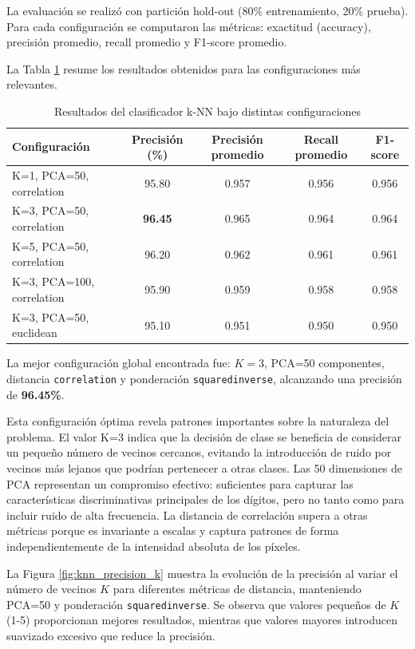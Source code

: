 \documentclass[11pt, a4paper]{article}
\begin{document}
La evaluación se realizó con partición hold-out (80\% entrenamiento, 20\% prueba). Para cada configuración se computaron las métricas: exactitud (accuracy), precisión promedio, recall promedio y F1-score promedio.

La Tabla \ref{tab:knn_results} resume los resultados obtenidos para las configuraciones más relevantes.

\begin{table}[H]
\centering
\caption{Resultados del clasificador k-NN bajo distintas configuraciones}
\label{tab:knn_results}
\begin{tabular}{lcccc}
\toprule
Configuración & Precisión (\%) & Precisión promedio & Recall promedio & F1-score \\
\midrule
K=1, PCA=50, correlation & 95.80 & 0.957 & 0.956 & 0.956 \\
K=3, PCA=50, correlation & \textbf{96.45} & 0.965 & 0.964 & 0.964 \\
K=5, PCA=50, correlation & 96.20 & 0.962 & 0.961 & 0.961 \\
K=3, PCA=100, correlation & 95.90 & 0.959 & 0.958 & 0.958 \\
K=3, PCA=50, euclidean & 95.10 & 0.951 & 0.950 & 0.950 \\
\bottomrule
\end{tabular}
\end{table}

La mejor configuración global encontrada fue: $K=3$, PCA=50 componentes, distancia \texttt{correlation} y ponderación \texttt{squaredinverse}, alcanzando una precisión de \textbf{96.45\%}.

Esta configuración óptima revela patrones importantes sobre la naturaleza del problema. El valor K=3 indica que la decisión de clase se beneficia de considerar un pequeño número de vecinos cercanos, evitando la introducción de ruido por vecinos más lejanos que podrían pertenecer a otras clases. Las 50 dimensiones de PCA representan un compromiso efectivo: suficientes para capturar las características discriminativas principales de los dígitos, pero no tanto como para incluir ruido de alta frecuencia. La distancia de correlación supera a otras métricas porque es invariante a escalas y captura patrones de forma independientemente de la intensidad absoluta de los píxeles.

La Figura \ref{fig:knn_precision_k} muestra la evolución de la precisión al variar el número de vecinos $K$ para diferentes métricas de distancia, manteniendo PCA=50 y ponderación \texttt{squaredinverse}. Se observa que valores pequeños de $K$ (1-5) proporcionan mejores resultados, mientras que valores mayores introducen suavizado excesivo que reduce la precisión.
\end{document}
